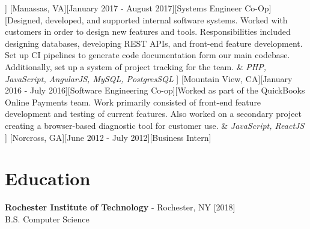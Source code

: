 \documentclass[showluaboxes=false]{resume}
\begin{document}
%
		]%
		[Manassas, VA][January 2017 - August 2017][Systems Engineer Co-Op][Designed, developed, and supported internal software systems. Worked with customers in order to design new features and tools. Responsibilities included designing databases, developing REST APIs, and front-end feature development. Set up CI pipelines to generate code documentation form our main codebase. Additionally, set up a system of project tracking for the team.%
		&%
		{\it PHP, JavaScript, AngularJS, MySQL, PostgresSQL}%
		]%
%
		[Mountain View, CA][January 2016 - July 2016][Software Engineering Co-op][Worked as part of the QuickBooks Online Payments team. Work primarily consisted of front-end feature development and testing of current features. Also worked on a secondary project creating a browser-based diagnostic tool for customer use.%
		&%
		{\it JavaScript, ReactJS}%
	    ]%
		[Norcross, GA][June 2012 - July 2012][Business Intern]%

		\section{Education}%
		\textbf{Rochester Institute of Technology}
		- {\small Rochester, NY}
		\hfill{}
		\\
		\begingroup
		\setlength{\parindent}{0.4in}
		\indent B.S. Computer Science
		\endgroup
		\vspace*{0.25\baselineskip}%
	
\end{document}
